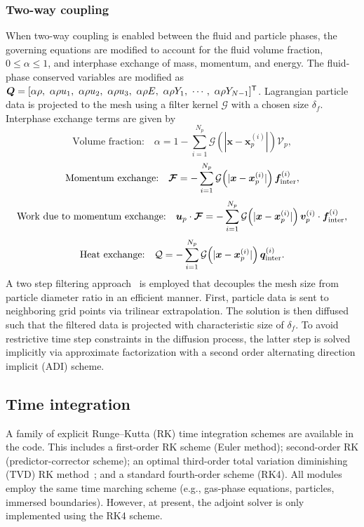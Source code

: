 \documentclass[12pt]{article}
\newcommand{\tr}{{\sf T}} %
\def \gxi{\mathcal{G}\!\left( | \bm{x}-\bm{x}_p^{(i)} | \right)}
\begin{document}
\subsubsection{Two-way coupling \label{sec:twoway}}
When two-way coupling is enabled between the fluid and particle phases, the governing equations are modified to account for the fluid volume fraction, $0\le\alpha\le1$, and interphase exchange of mass, momentum, and energy. The fluid-phase conserved variables are modified as $\bm{Q}=[\alpha\rho, \ \alpha\rho u_1, \ \alpha\rho u_2, \ \alpha\rho u_3, \ \alpha\rho E, \ \alpha\rho Y_1, \ \cdots, \  \alpha\rho Y_{N-1}]^\tr$. Lagrangian particle data is projected to the mesh using a filter kernel $\mathcal{G}$ with a chosen size $\delta_f$. Interphase exchange terms are given by
\begin{equation}\label{eq:vf_project}
\text{Volume fraction:}\quad\alpha=1- \sum_{i = 1}^{N_p} \gxi \mathcal{V}_p,
\end{equation}
\begin{equation}
\text{Momentum exchange:}\quad\bm{\mathcal{F}} = -\sum_{i = 1}^{N_p} \gxi \bm{f}_{\rm inter}^{(i)},
\end{equation}
\begin{equation}
\text{Work due to momentum exchange:}\quad\bm{u}_p \cdot \bm{\mathcal{F}} = -\sum_{i = 1}^{N_p} \gxi \bm{v}_p^{(i)} \cdot \bm{f}_{\rm inter}^{(i)},
\end{equation}
\begin{equation}
\text{Heat exchange:}\quad\mathcal{Q} = - \sum_{i = 1}^{N_p} \gxi \bm{q}_{\rm inter}^{(i)}.
\end{equation}
A two step filtering approach~\cite{capecelatro2013euler} is employed that decouples the mesh size from particle diameter ratio in an efficient manner. First, particle data is sent to neighboring grid points via trilinear extrapolation. The solution is then diffused such that the filtered data is projected with characteristic size of $\delta_f$. To avoid restrictive time step constraints in the diffusion process, the latter step is solved implicitly via approximate factorization with a second order alternating direction implicit (ADI) scheme.

\subsection{Time integration}
A family of explicit Runge--Kutta (RK) time integration schemes are available in the code. This includes a first-order RK scheme (Euler method); second-order RK (predictor-corrector scheme); an optimal third-order total variation diminishing (TVD) RK method~\cite{gottlieb1998total}; and a standard fourth-order scheme (RK4). All modules employ the same time marching scheme (e.g., gas-phase equations, particles, immersed boundaries). However, at present, the adjoint solver is only implemented using the RK4 scheme.
\end{document}
